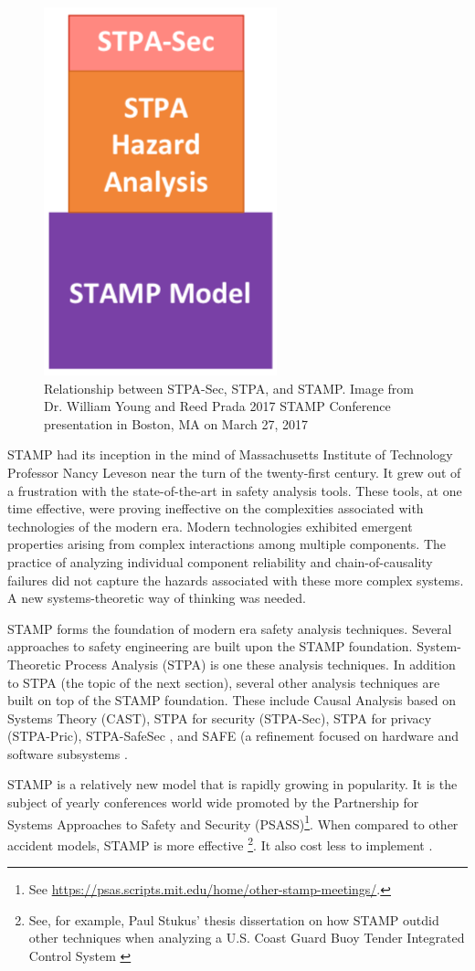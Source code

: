 \documentclass[../../main/main.tex]{subfiles}
\begin{document}
\begin{figure}[h!]
\centering
\includegraphics[width=0.3\linewidth]{../figures/stampstpa}
\caption{\label{stampstpa}Relationship between STPA-Sec, STPA, and STAMP.  Image from Dr. William Young and Reed Prada 2017 STAMP Conference presentation in Boston, MA on March 27, 2017 \cite{youngPorada} }
\end{figure}

STAMP had its inception in the mind of Massachusetts Institute of Technology Professor Nancy Leveson near the turn of the twenty-first century. It grew out of a frustration with the state-of-the-art in safety analysis tools.  These tools, at one time effective, were proving ineffective on the complexities associated with technologies of the modern era.  Modern technologies exhibited emergent properties arising from complex interactions among multiple components.  The practice of analyzing individual component reliability and chain-of-causality failures did not capture the hazards associated with these more complex systems.  A new systems-theoretic way of thinking was needed.  

STAMP forms the foundation of modern era safety analysis techniques.  Several approaches to safety engineering are built upon the STAMP foundation.  System-Theoretic Process Analysis (STPA) is one these analysis techniques.  In addition to STPA (the topic of the next section), several other analysis techniques are built on top of the STAMP foundation.  These include Causal Analysis based on Systems Theory (CAST), STPA for security (STPA-Sec), STPA for privacy (STPA-Pric), STPA-SafeSec \cite{safe}, and SAFE (a refinement focused on hardware and software subsystems \cite{safe}.

STAMP is a relatively new model that is rapidly growing in popularity.  It is the subject of yearly conferences world wide promoted by the Partnership for Systems Approaches to Safety and Security (PSASS)\footnote{See \url{https://psas.scripts.mit.edu/home/other-stamp-meetings/}.}.  When compared to other accident models, STAMP is more effective \footnote{See, for example, Paul Stukus' thesis dissertation on how STAMP outdid other techniques when analyzing a U.S. Coast Guard Buoy Tender Integrated Control System \cite{buoy}}.  It also cost less to implement \cite{stpa}.
\end{document}
